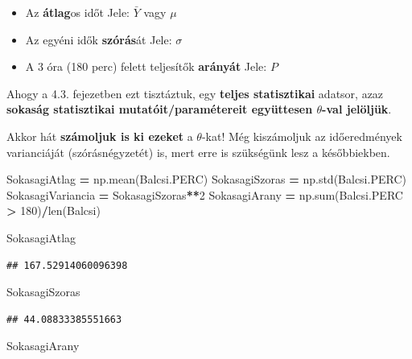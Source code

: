 \documentclass[
]{book}
\newenvironment{Shaded}{\begin{snugshade}}{\end{snugshade}}
\newcommand{\BuiltInTok}[1]{#1}
\newcommand{\DecValTok}[1]{\textcolor[rgb]{0.00,0.00,0.81}{#1}}
\newcommand{\NormalTok}[1]{#1}
\newcommand{\OperatorTok}[1]{\textcolor[rgb]{0.81,0.36,0.00}{\textbf{#1}}}
\providecommand{\tightlist}{%
  \setlength{\itemsep}{0pt}\setlength{\parskip}{0pt}}
\begin{document}
\begin{itemize}
\tightlist
\item
  Az \textbf{átlag}os időt Jele: \(\bar{Y}\) vagy \(\mu\)
\item
  Az egyéni idők \textbf{szórás}át Jele: \(\sigma\)
\item
  A 3 óra (180 perc) felett teljesítők \textbf{arányát} Jele: \(P\)
\end{itemize}

Ahogy a 4.3. fejezetben ezt tisztáztuk, egy \textbf{teljes statisztikai} adatsor, azaz \textbf{sokaság statisztikai mutatóit/paramétereit együttesen \(\theta\)-val jelöljük}.

Akkor hát \textbf{számoljuk is ki ezeket} a \(\theta\)-kat! Még kiszámoljuk az időeredmények varianciáját (szórásnégyzetét) is, mert erre is szükségünk lesz a későbbiekben.

\begin{Shaded}
\begin{Highlighting}[]
\NormalTok{SokasagiAtlag }\OperatorTok{=}\NormalTok{ np.mean(Balcsi.PERC)}
\NormalTok{SokasagiSzoras }\OperatorTok{=}\NormalTok{ np.std(Balcsi.PERC)}
\NormalTok{SokasagiVariancia }\OperatorTok{=}\NormalTok{ SokasagiSzoras}\OperatorTok{**}\DecValTok{2}
\NormalTok{SokasagiArany }\OperatorTok{=}\NormalTok{ np.}\BuiltInTok{sum}\NormalTok{(Balcsi.PERC }\OperatorTok{\textgreater{}} \DecValTok{180}\NormalTok{)}\OperatorTok{/}\BuiltInTok{len}\NormalTok{(Balcsi)}

\NormalTok{SokasagiAtlag}
\end{Highlighting}
\end{Shaded}

\begin{verbatim}
## 167.52914060096398
\end{verbatim}

\begin{Shaded}
\begin{Highlighting}[]
\NormalTok{SokasagiSzoras}
\end{Highlighting}
\end{Shaded}

\begin{verbatim}
## 44.08833385551663
\end{verbatim}

\begin{Shaded}
\begin{Highlighting}[]
\NormalTok{SokasagiArany}
\end{Highlighting}
\end{Shaded}
\end{document}
